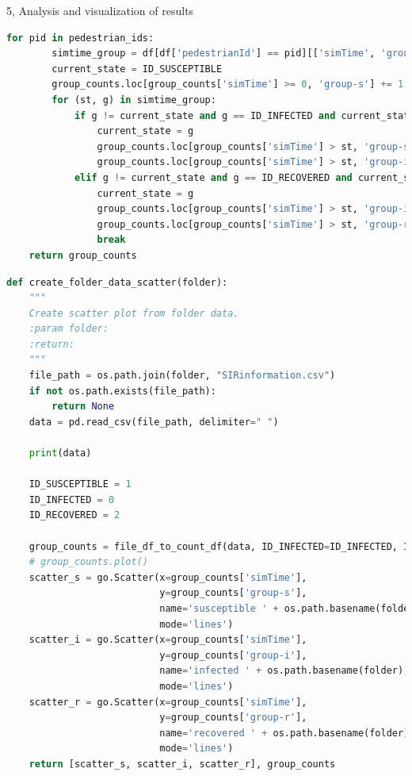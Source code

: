 \documentclass[10pt,a4paper]{article}
\begin{document}
\begin{task}{5, Analysis and visualization of results}
\begin{lstlisting}[language = Python, caption={New version of the \textit{file\_df\_to\_count\_df()} method, which now counts the added recovered group}, label={new_df}]
    for pid in pedestrian_ids:
        simtime_group = df[df['pedestrianId'] == pid][['simTime', 'groupId-PID5']].values
        current_state = ID_SUSCEPTIBLE
        group_counts.loc[group_counts['simTime'] >= 0, 'group-s'] += 1
        for (st, g) in simtime_group:
            if g != current_state and g == ID_INFECTED and current_state == ID_SUSCEPTIBLE:
                current_state = g
                group_counts.loc[group_counts['simTime'] > st, 'group-s'] -= 1
                group_counts.loc[group_counts['simTime'] > st, 'group-i'] += 1
            elif g != current_state and g == ID_RECOVERED and current_state == ID_INFECTED:
                current_state = g
                group_counts.loc[group_counts['simTime'] > st, 'group-i'] -= 1
                group_counts.loc[group_counts['simTime'] > st, 'group-r'] += 1
                break
    return group_counts
\end{lstlisting}

\begin{lstlisting}[language = Python, caption={New version of the \textit{create\_folder\_data\_scatter()} method, which now adds the scatter plot of the recovered group}, label={new_folder}]
def create_folder_data_scatter(folder):
    """
    Create scatter plot from folder data.
    :param folder:
    :return:
    """
    file_path = os.path.join(folder, "SIRinformation.csv")
    if not os.path.exists(file_path):
        return None
    data = pd.read_csv(file_path, delimiter=" ")

    print(data)

    ID_SUSCEPTIBLE = 1
    ID_INFECTED = 0
    ID_RECOVERED = 2

    group_counts = file_df_to_count_df(data, ID_INFECTED=ID_INFECTED, ID_SUSCEPTIBLE=ID_SUSCEPTIBLE, ID_RECOVERED=ID_RECOVERED)
    # group_counts.plot()
    scatter_s = go.Scatter(x=group_counts['simTime'],
                           y=group_counts['group-s'],
                           name='susceptible ' + os.path.basename(folder),
                           mode='lines')
    scatter_i = go.Scatter(x=group_counts['simTime'],
                           y=group_counts['group-i'],
                           name='infected ' + os.path.basename(folder),
                           mode='lines')
    scatter_r = go.Scatter(x=group_counts['simTime'],
                           y=group_counts['group-r'],
                           name='recovered ' + os.path.basename(folder),
                           mode='lines')
    return [scatter_s, scatter_i, scatter_r], group_counts
\end{lstlisting}


\end{task}
\end{document}
